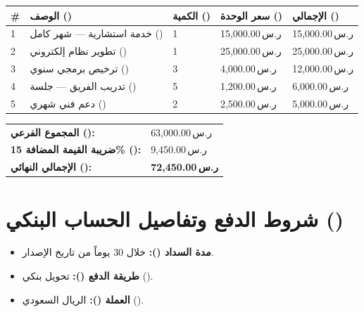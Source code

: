 \documentclass[11pt,a4paper]{article}
\newcommand{\currency}[1]{#1\,\textarabic{ر.س}}
\begin{document}
\begin{table}[H]
\centering
\renewcommand{\arraystretch}{1.5}
\begin{tabularx}{\textwidth}{C{1cm} L{6.5cm} C{2cm} R{3cm} R{3cm}}
\toprule
\textbf{\#} & \textbf{الوصف ()} & \textbf{الكمية ()} & \textbf{سعر الوحدة ()} & \textbf{الإجمالي ()} \\
 & خدمة استشارية — شهر كامل () & 1 & \currency{15,000.00} & \currency{15,000.00} \\
2 & تطوير نظام إلكتروني () & 1 & \currency{25,000.00} & \currency{25,000.00} \\
3 & ترخيص برمجي سنوي () & 3 & \currency{4,000.00} & \currency{12,000.00} \\
4 & تدريب الفريق — جلسة () & 5 & \currency{1,200.00} & \currency{6,000.00} \\
5 & دعم فني شهري () & 2 & \currency{2,500.00} & \currency{5,000.00} \\
\bottomrule
\end{tabularx}
\end{table}

\vspace{1em}

\hfill
\begin{tabularx}{8cm}{L{4.5cm} R{3cm}}
\toprule
\textbf{المجموع الفرعي ():} & \currency{63,000.00} \\
\textbf{ضريبة القيمة المضافة 15\% ():} & \currency{9,450.00} \\
\midrule
\textbf{\large الإجمالي النهائي ():} & \textbf{\large\color{accentColor}\currency{72,450.00}} \\
\bottomrule
\end{tabularx}

\vspace{1.5em}

\section*{شروط الدفع وتفاصيل الحساب البنكي ()}

\begin{itemize}[leftmargin=2em,itemsep=0.3em]
    \item \textbf{مدة السداد ():} خلال 30 يوماً من تاريخ الإصدار. %
    \item \textbf{طريقة الدفع ():} تحويل بنكي ().
    \item \textbf{العملة ():} الريال السعودي (). %
\end{itemize}
\end{document}
